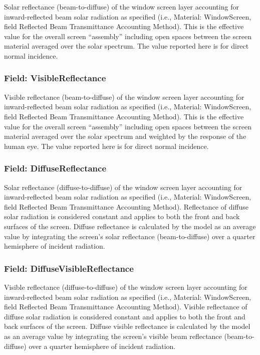 Solar reflectance (beam-to-diffuse) of the window screen layer accounting for inward-reflected beam solar radiation as specified (i.e., Material: WindowScreen, field Reflected Beam Transmittance Accounting Method). This is the effective value for the overall screen ``assembly'' including open spaces between the screen material averaged over the solar spectrum. The value reported here is for direct normal incidence.

\subsubsection{Field: VisibleReflectance}\label{field-visiblereflectance}

Visible reflectance (beam-to-diffuse) of the window screen layer accounting for inward-reflected beam solar radiation as specified (i.e., Material: WindowScreen, field Reflected Beam Transmittance Accounting Method). This is the effective value for the overall screen ``assembly'' including open spaces between the screen material averaged over the solar spectrum and weighted by the response of the human eye. The value reported here is for direct normal incidence.

\subsubsection{Field: DiffuseReflectance}\label{field-diffusereflectance}

Solar reflectance (diffuse-to-diffuse) of the window screen layer accounting for inward-reflected beam solar radiation as specified (i.e., Material: WindowScreen, field Reflected Beam Transmittance Accounting Method). Reflectance of diffuse solar radiation is considered constant and applies to both the front and back surfaces of the screen. Diffuse reflectance is calculated by the model as an average value by integrating the screen's solar reflectance (beam-to-diffuse) over a quarter hemisphere of incident radiation.

\subsubsection{Field: DiffuseVisibleReflectance}\label{field-diffusevisiblereflectance}

Visible reflectance (diffuse-to-diffuse) of the window screen layer accounting for inward-reflected beam solar radiation as specified (i.e., Material: WindowScreen, field Reflected Beam Transmittance Accounting Method). Visible reflectance of diffuse solar radiation is considered constant and applies to both the front and back surfaces of the screen. Diffuse visible reflectance is calculated by the model as an average value by integrating the screen's visible beam reflectance (beam-to-diffuse) over a quarter hemisphere of incident radiation.

